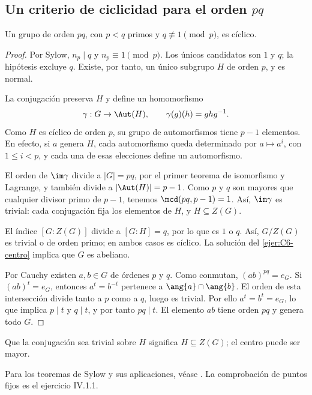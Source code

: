 \subsection{Un criterio de ciclicidad para el orden \texorpdfstring{$pq$}{pq}}
\begin{prop}\label{prop:C7-pq}
Un grupo de orden $pq$, con $p<q$ primos y $q\not\equiv1\pmod p$, es cíclico.
\end{prop}
\begin{proof}
Por Sylow, $n_p\mid q$ y $n_p\equiv1\pmod p$. Los únicos candidatos son $1$ y $q$; la hipótesis excluye $q$. Existe, por tanto, un único subgrupo $H$ de orden $p$, y es normal.

La conjugación preserva $H$ y define un homomorfismo
\[
\gamma:G\to\Aut(H),\qquad \gamma(g)(h)=ghg^{-1}.
\]
Como $H$ es cíclico de orden $p$, su grupo de automorfismos tiene $p-1$ elementos. En efecto, si $a$ genera $H$, cada automorfismo queda determinado por $a\mapsto a^i$, con $1\le i<p$, y cada una de esas elecciones define un automorfismo.

El orden de $\im\gamma$ divide a $|G|=pq$, por el primer teorema de isomorfismo y Lagrange, y también divide a $|\Aut(H)|=p-1$. Como $p$ y $q$ son mayores que cualquier divisor primo de $p-1$, tenemos $\mcd(pq,p-1)=1$. Así, $\im\gamma$ es trivial: cada conjugación fija los elementos de $H$, y $H\subseteq Z(G)$.

El índice $[G:Z(G)]$ divide a $[G:H]=q$, por lo que es $1$ o $q$. Así, $G/Z(G)$ es trivial o de orden primo; en ambos casos es cíclico. La solución del \cref{ejer:C6-centro} implica que $G$ es abeliano.

Por Cauchy existen $a,b\in G$ de órdenes $p$ y $q$. Como conmutan, $(ab)^{pq}=e_G$. Si $(ab)^t=e_G$, entonces $a^t=b^{-t}$ pertenece a $\ang{a}\cap\ang{b}$. El orden de esta intersección divide tanto a $p$ como a $q$, luego es trivial. Por ello $a^t=b^t=e_G$, lo que implica $p\mid t$ y $q\mid t$, y por tanto $pq\mid t$. El elemento $ab$ tiene orden $pq$ y genera todo $G$.
\end{proof}
\begin{obs}
Que la conjugación sea trivial sobre $H$ significa $H\subseteq Z(G)$; el centro puede ser mayor.
\end{obs}

\begin{obs}
Para los teoremas de Sylow y sus aplicaciones, véase \citet[cap.~IV, 2.2--3/5--6/8--16]{aluffi2009}. La comprobación de puntos fijos es el ejercicio IV.1.1.
\end{obs}
